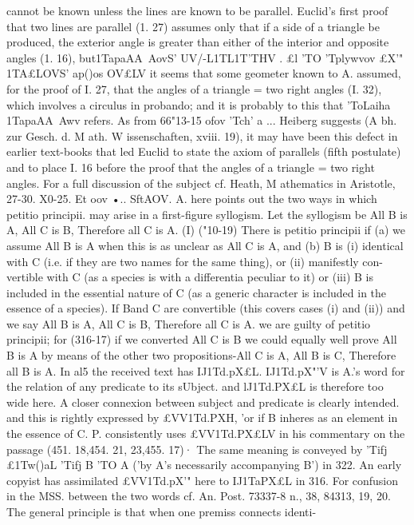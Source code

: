 {{{{{cannot be known unless the lines are known to be parallel.
Euclid's first proof that two lines are parallel (1. 27) assumes only
that if a side of a triangle be produced, the exterior angle is
greater than either of the interior and opposite angles (1. 16), but1TapaAA~AovS' UV/-L1TL1T'THV .
£l 'TO 'Tplywvov
£X'" 1TA£LOVS' ap()os OV£LV it seems that some geometer known to A.
assumed, for the proof of I. 27, that the angles of a triangle =
two right angles (I. 32), which involves a circulus in probando; and
it is probably to this that 'ToLaiha
1TapaAA~Awv refers. As
from 66"13-15 ofov 'Tch'
a ...
Heiberg suggests (A bh. zur Gesch. d. M ath. W issenschaften, xviii.
19), it may have been this defect in earlier text-books that led
Euclid to state the axiom of parallels (fifth postulate) and to
place I. 16 before the proof that the angles of a triangle = two
right angles. For a full discussion of the subject cf. Heath,
M athematics in Aristotle, 27-30.
X0-25. Et oov •.. SftAOV. A. here points out the two ways in
which petitio principii. may arise in a first-figure syllogism. Let
the syllogism be All B is A, All C is B, Therefore all C is A. (I)
("10-19) There is petitio principii if (a) we assume All B is A when
this is as unclear as All C is A, and (b) B is (i) identical with C (i.e.
if they are two names for the same thing), or (ii) manifestly con-
vertible with C (as a species is with a differentia peculiar to it) or
(iii) B is included in the essential nature of C (as a generic character
is included in the essence of a species). If Band C are convertible
(this covers cases (i) and (ii)) and we say All B is A, All C is B,
Therefore all C is A. we are guilty of petitio principii; for (316-17)
if we converted All C is B we could equally well prove All B is A
by means of the other two propositions-All C is A, All B is C,
Therefore all B is A.
In al5 the received text has IJ1Td.pX£L. IJ1Td.pX"'V is A.'s word for
the relation of any predicate to its sUbject. and lJ1Td.PX£L is therefore
too wide here. A closer connexion between subject and predicate
is clearly intended. and this is rightly expressed by £VV1Td.PXH, 'or
if B inheres as an element in the essence of C. P. consistently
uses £VV1Td.PX£LV in his commentary on the passage (451. 18,454. 21,
23,455. 17)· The same meaning is conveyed by 'Tifj £1Tw()aL 'Tifj B 'TO
A ('by A's necessarily accompanying B') in 322. An early copyist
has assimilated £VV1Td.pX'" here to IJ1TaPX£L in 316. For confusion in
the MSS. between the two words cf. An. Post. 73337-8 n., 38,
84313, 19,
20.
The general principle is that when one premiss connects identi-
}}}}}
